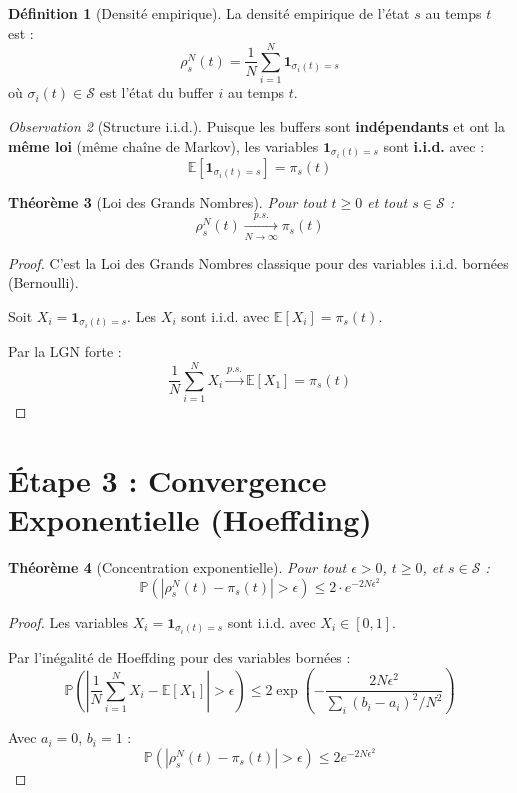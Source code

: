 \documentclass[11pt,a4paper]{article}
\theoremstyle{plain}
\newtheorem{theorem}{Théorème}[section]
\theoremstyle{definition}
\newtheorem{definition}[theorem]{Définition}
\theoremstyle{remark}
\newtheorem{observation}[theorem]{Observation}
\newcommand{\E}{\mathbb{E}}
\newcommand{\Prob}{\mathbb{P}}
\newcommand{\ind}{\mathbf{1}}
\newcommand{\calS}{\mathcal{S}}
\begin{document}
\begin{definition}[Densité empirique]
La densité empirique de l'état $s$ au temps $t$ est :
\[
\rho^N_s(t) = \frac{1}{N} \sum_{i=1}^{N} \ind_{\sigma_i(t) = s}
\]
où $\sigma_i(t) \in \calS$ est l'état du buffer $i$ au temps $t$.
\end{definition}

\begin{observation}[Structure i.i.d.]
Puisque les buffers sont \textbf{indépendants} et ont la \textbf{même loi} (même chaîne de Markov), les variables $\ind_{\sigma_i(t) = s}$ sont \textbf{i.i.d.} avec :
\[
\E[\ind_{\sigma_i(t) = s}] = \pi_s(t)
\]
\end{observation}

\begin{theorem}[Loi des Grands Nombres]\label{thm:lgn}
Pour tout $t \geq 0$ et tout $s \in \calS$ :
\[
\rho^N_s(t) \xrightarrow[N \to \infty]{p.s.} \pi_s(t)
\]
\end{theorem}

\begin{proof}
C'est la Loi des Grands Nombres classique pour des variables i.i.d. bornées (Bernoulli).

Soit $X_i = \ind_{\sigma_i(t) = s}$. Les $X_i$ sont i.i.d. avec $\E[X_i] = \pi_s(t)$.

Par la LGN forte :
\[
\frac{1}{N} \sum_{i=1}^N X_i \xrightarrow{p.s.} \E[X_1] = \pi_s(t)
\]
\end{proof}

\section{Étape 3 : Convergence Exponentielle (Hoeffding)}

\begin{theorem}[Concentration exponentielle]\label{thm:hoeffding}
Pour tout $\epsilon > 0$, $t \geq 0$, et $s \in \calS$ :
\[
\boxed{\Prob\left( |\rho^N_s(t) - \pi_s(t)| > \epsilon \right) \leq 2 \cdot e^{-2N\epsilon^2}}
\]
\end{theorem}

\begin{proof}
Les variables $X_i = \ind_{\sigma_i(t) = s}$ sont i.i.d. avec $X_i \in [0, 1]$.

Par l'inégalité de Hoeffding pour des variables bornées :
\[
\Prob\left( \left| \frac{1}{N}\sum_{i=1}^N X_i - \E[X_1] \right| > \epsilon \right) \leq 2 \exp\left( -\frac{2N\epsilon^2}{\sum_i (b_i - a_i)^2 / N^2} \right)
\]

Avec $a_i = 0$, $b_i = 1$ :
\[
\Prob\left( |\rho^N_s(t) - \pi_s(t)| > \epsilon \right) \leq 2 e^{-2N\epsilon^2}
\]
\end{proof}
\end{document}
